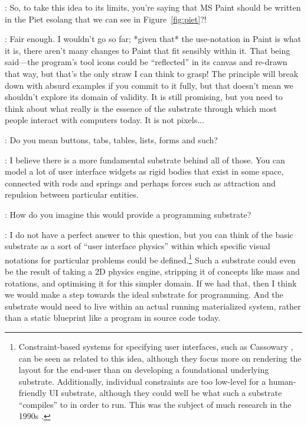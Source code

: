 \documentclass[runningheads]{llncs}
\newcommand{\T}{Tomas}
\newcommand{\J}{Joel}
\newcommand{\says}[2][gg]{\vspace{0.5em}\noindent\hangindent=0.5cm{\textsc{#1}}: #2}
\begin{document}
\says[\T]{So, to take this idea to its limits, you're saying that MS Paint should be written in the Piet esolang that we can see in Figure~\ref{fig:piet}?!}

\says[\J]{Fair enough. I wouldn't go so far; *given that* the use-notation in Paint is what it is, there aren't many changes to Paint that fit sensibly within it. That being said---the program's tool icons could be ``reflected'' in its canvas and re-drawn that way, but that's the only straw I can think to grasp! The principle will break down with absurd examples if you commit to it fully, but that doesn't mean we shouldn't explore its domain of validity. It is still promising, but you need to think about what really is the essence of the substrate through which most people interact with computers today. It is not pixels...}

\says[\T]{Do you mean buttons, tabs, tables, lists, forms and such?}

\says[\J]{I believe there is a more fundamental substrate behind all of those. You can model a lot of user interface widgets as rigid bodies that exist in some space, connected with rods and springs and perhaps forces such as attraction and repulsion between particular entities.}

\says[\T]{How do you imagine this would provide a programming substrate?}

\says[\J]{I do not have a perfect answer to this question, but you can think of the basic substrate as a sort of ``user interface physics'' within which specific visual notations for particular problems could be defined.\footnote{Constraint-based systems for specifying user interfaces, such as Cassowary \cite{borning-1997-constraints}, can be seen as related to this idea, although they focus more on rendering the layout for the end-user than on developing a foundational underlying substrate. Additionally, individual constraints are too low-level for a human-friendly UI substrate, although they could well be what such a substrate ``compiles'' to in order to run. This was the subject of much research in the 1990s \cite{myers-1992-uilangs}.} Such a substrate could even be the result of taking a 2D physics engine, stripping it of concepts like mass and rotations, and optimising it for this simpler domain. If we had that, then I think we would make a step towards the ideal substrate for programming. And the substrate would need to live within an actual running materialized system, rather than a static blueprint like a program in source code today.}
\end{document}
